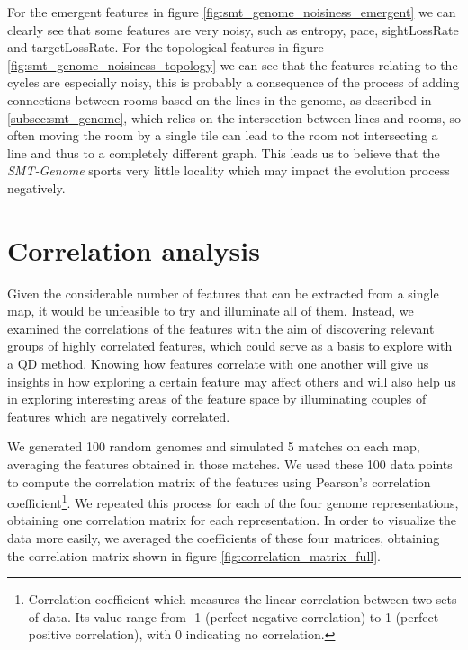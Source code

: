 For the emergent features in figure \cref{fig:smt_genome_noisiness_emergent} we can clearly see that some features are very noisy, such as entropy, pace, sightLossRate and targetLossRate. For the topological features in figure \cref{fig:smt_genome_noisiness_topology} we can see that the features relating to the cycles are especially noisy, this is probably a consequence of the process of adding connections between rooms based on the lines in the genome, as described in \cref{subsec:smt_genome}, which relies on the intersection between lines and rooms, so often moving the room by a single tile can lead to the room not intersecting a line and thus to a completely different graph. This leads us to believe that the \textit{SMT-Genome} sports very little locality which may impact the evolution process negatively.

\section{Correlation analysis}
\label{sec:correlation_analysis}
Given the considerable number of features that can be extracted from a single map, it would be unfeasible to  try and illuminate all of them. Instead, we examined the correlations of the features with the aim of discovering relevant groups of highly correlated features, which could serve as a basis to explore with a QD method. Knowing how features correlate with one another will give us insights in how exploring a certain feature may affect others and will also help us in exploring interesting areas of the feature space by illuminating couples of features which are negatively correlated.

We generated 100 random genomes and simulated 5 matches on each map, averaging the features obtained in those matches. We used these 100 data points to compute the correlation matrix of the features using Pearson's correlation coefficient\footnote{Correlation coefficient which measures the linear correlation between two sets of data. Its value range from -1 (perfect negative correlation) to 1 (perfect positive correlation), with 0 indicating no correlation.}. We repeated this process for each of the four genome representations, obtaining one correlation matrix for each representation. In order to visualize the data more easily, we averaged the coefficients of these four matrices, obtaining the correlation matrix shown in figure \cref{fig:correlation_matrix_full}.

